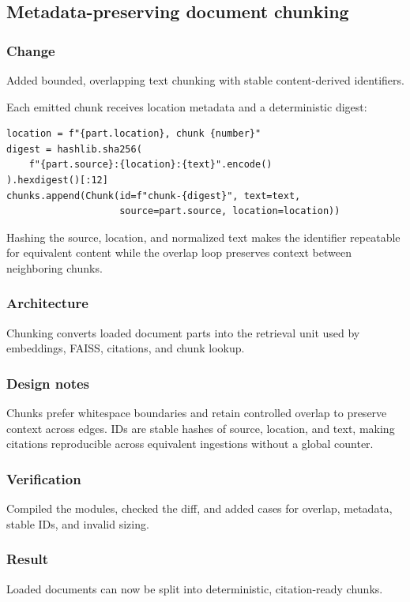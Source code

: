 
\subsection{Metadata-preserving document chunking}


\subsubsection{Change}

Added bounded, overlapping text chunking with stable content-derived identifiers.

Each emitted chunk receives location metadata and a deterministic digest:

\begin{verbatim}
location = f"{part.location}, chunk {number}"
digest = hashlib.sha256(
    f"{part.source}:{location}:{text}".encode()
).hexdigest()[:12]
chunks.append(Chunk(id=f"chunk-{digest}", text=text,
                    source=part.source, location=location))
\end{verbatim}

Hashing the source, location, and normalized text makes the identifier repeatable for equivalent content while the overlap loop preserves context between neighboring chunks.

\subsubsection{Architecture}

Chunking converts loaded document parts into the retrieval unit used by embeddings, FAISS, citations, and chunk lookup.

\subsubsection{Design notes}

Chunks prefer whitespace boundaries and retain controlled overlap to preserve context across edges. IDs are stable hashes of source, location, and text, making citations reproducible across equivalent ingestions without a global counter.

\subsubsection{Verification}

Compiled the modules, checked the diff, and added cases for overlap, metadata, stable IDs, and invalid sizing.

\subsubsection{Result}

Loaded documents can now be split into deterministic, citation-ready chunks.

